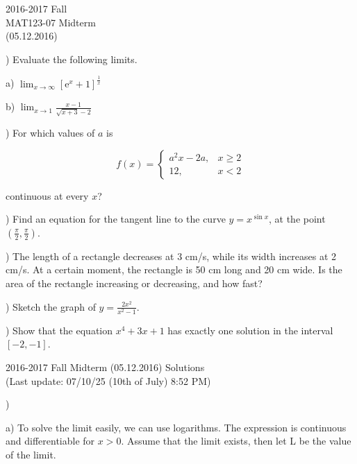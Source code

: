\documentclass{article}
\begin{document}
\pagestyle{empty}
\large

\begin{center}
2016-2017 Fall \\MAT123-07 Midterm\\(05.12.2016)
\end{center}

) Evaluate the following limits.

\hfill

\noindent a) $\displaystyle \lim_{x \to \infty} [\mathrm{e}^x + 1]^{\frac{1}{x}}$

\hfill

\noindent b) $\displaystyle \lim_{x \to 1} \frac{x-1}{\sqrt{x+3} - 2}$

\hfill

) For which values of $a$ is

\[
f(x) =
\begin{cases}
a^2x - 2a, & x \geq 2 \\
12,  & x < 2
\end{cases}
\]

\noindent continuous at every $x$?

\hfill

) Find an equation for the tangent line to the curve $ y = x^{\sin x}$, at the point $(\frac{\pi}{2}, \frac{\pi}{2})$.

\hfill

) The length of a rectangle decreases at 3 cm/s, while its width increases at 2 cm/s. At a certain moment, the rectangle is 50 cm long and 20 cm wide. Is the area of the rectangle increasing or decreasing, and how fast?

\hfill

) Sketch the graph of $\displaystyle y = \frac{2x^2}{x^2-1}$.

\hfill

) Show that the equation $x^4 + 3x + 1$ has exactly one solution in the interval $[-2, -1]$.

\newpage

\begin{center}
2016-2017 Fall Midterm (05.12.2016) Solutions\\
(Last update: 07/10/25 (10th of July) 8:52 PM)
\end{center}

)

\hfill

\noindent a) To solve the limit easily, we can use logarithms. The expression is continuous and differentiable for $x > 0$. Assume that the limit exists, then let L be the value of the limit.
\end{document}
